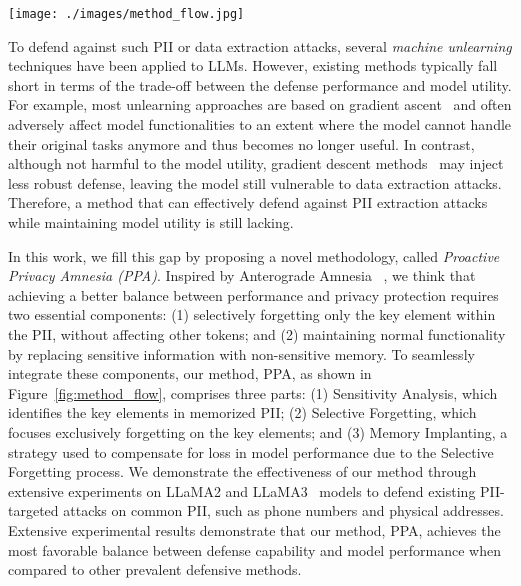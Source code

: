 \begin{figure*}[t!]
\centering
\vspace{-1.0cm}
  \texttt{[image: ./images/method\_flow.jpg]}
  \caption{The flowchart illustrates our method, Proactive Privacy Amnesia (PPA). All examples presented in the flowchart are real instances from the LLaMA2-7b experiments.}
  \label{fig:method_flow}
\end{figure*}


To defend against such PII or data extraction attacks, several \textit{machine unlearning} techniques have been applied to LLMs. 
However, existing methods typically fall short in terms of the trade-off between the defense performance and model utility.
For example, most unlearning approaches are based on gradient ascent~\citep{jang2022knowledge,wang2024selective} and often adversely affect model functionalities to an extent where the model cannot handle their original tasks anymore and thus becomes no longer useful.
In contrast, although not harmful to the model utility, gradient descent methods~\citep{patil2023can,ouyang2022training,de2021editing} may inject less robust defense, leaving the model still vulnerable to data extraction attacks.
Therefore, a method that can effectively defend against PII extraction attacks while maintaining model utility is still lacking.


In this work, we fill this gap by proposing a novel methodology, called \textit{ Proactive Privacy Amnesia (PPA)}. Inspired by Anterograde Amnesia ~\citep{markowitsch2008anterograde}, we think that achieving a better balance between performance and privacy protection requires two essential components: (1) selectively forgetting only the key element within the PII, without affecting other tokens; and (2) maintaining normal functionality by replacing sensitive information with non-sensitive memory. To seamlessly integrate these components, our method, PPA, as shown in Figure~\ref{fig:method_flow}, comprises three parts: (1) Sensitivity Analysis, which identifies the key elements in memorized PII; (2) Selective Forgetting, which focuses exclusively forgetting on the key elements; and (3) Memory Implanting, a strategy used to compensate for loss in model performance due to the Selective Forgetting process. We demonstrate the effectiveness of our method through extensive experiments on LLaMA2 \citep{touvron2023llama} and LLaMA3~\citep{dubey2024llama} models to defend existing PII-targeted attacks on common PII, such as phone numbers and physical addresses. Extensive experimental results demonstrate that our method, PPA, achieves the most favorable balance between defense capability and model performance when compared to other prevalent defensive methods. 


